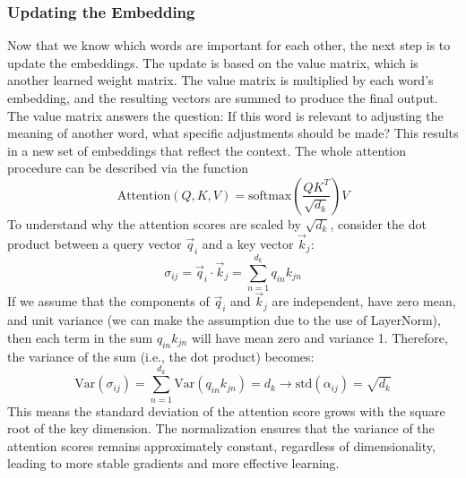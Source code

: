 \subsubsection{Updating the Embedding}
Now that we know which words are important for each other, the next step is to update the embeddings. The 
update is based on the value matrix, which is another learned weight matrix. The value matrix is multiplied 
by each word’s embedding, and the resulting vectors are summed to produce the final output.\newline
The value matrix answers the question: If this word is relevant to adjusting the meaning of another word, what specific adjustments should be made? This results in a new set of embeddings that reflect the context. The whole attention procedure 
can be described via the function $$\text{Attention}(Q,K,V) = \text{softmax}\left(\frac{QK^T}{\sqrt{d_k}}\right)V$$
To understand why the attention scores are scaled by $\sqrt{d_k}$, consider the dot product between a 
query vector $\vec{q}_i$ and a key vector $\vec{k}_j$:
$$\sigma_{ij} = \vec{q}_i \cdot \vec{k}_j = \sum_{n=1}^{d_k} q_{in} k_{jn}$$
If we assume that the components of $\vec{q}_i$ and $\vec{k}_j$ are independent, have zero mean, and unit variance (we can 
make the assumption due to the use of LayerNorm), then each term in the sum $q_{in} k_{jn}$ will have mean zero and variance 
1. Therefore, the variance of the sum (i.e., the dot product) becomes:
$$\text{Var}(\sigma_{ij}) = \sum_{n=1}^{d_k} \text{Var}(q_{in} k_{jn}) = d_k \longrightarrow 
\text{std}(\alpha_{ij}) = \sqrt{d_k}$$
This means the standard deviation of the attention score grows with the square root of the key dimension. The normalization 
ensures that the variance of the attention scores remains approximately constant, regardless of dimensionality, leading to 
more stable gradients and more effective learning.
